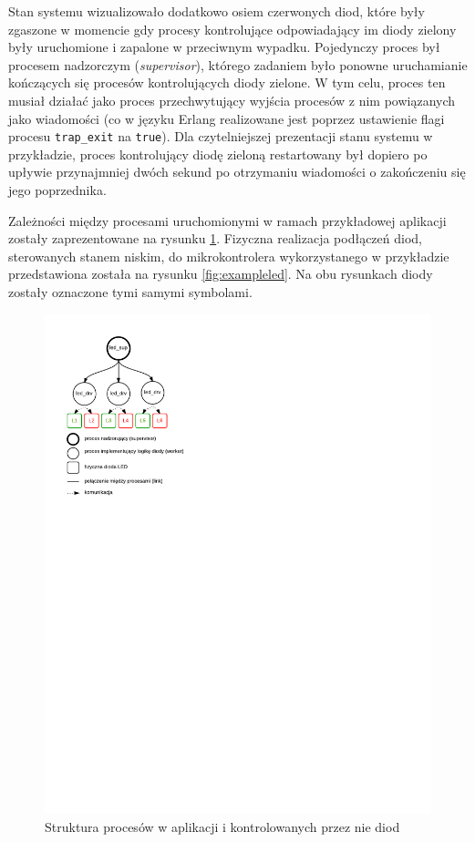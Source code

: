 Stan systemu wizualizowało dodatkowo osiem czerwonych diod, które były zgaszone w momencie gdy procesy kontrolujące odpowiadający im diody zielony były uruchomione i zapalone w przeciwnym wypadku.
Pojedynczy proces był procesem nadzorczym (\emph{supervisor}), którego zadaniem było ponowne uruchamianie kończących się procesów kontrolujących diody zielone. W tym celu, proces ten musiał działać jako proces przechwytujący wyjścia procesów z nim powiązanych jako wiadomości (co w języku Erlang realizowane jest poprzez ustawienie flagi procesu \texttt{trap\_exit} na \texttt{true}).
Dla czytelniejszej prezentacji stanu systemu w przykładzie, proces kontrolujący diodę zieloną restartowany był dopiero po upływie przynajmniej dwóch sekund po otrzymaniu wiadomości o zakończeniu się jego poprzednika.

Zależności między procesami uruchomionymi w ramach przykładowej aplikacji zostały zaprezentowane na rysunku \ref{fig:exampleledprocesses}. Fizyczna realizacja podłączeń diod, sterowanych stanem niskim, do mikrokontrolera wykorzystanego w przykładzie przedstawiona została na rysunku \ref{fig:exampleled}. Na obu rysunkach diody zostały oznaczone tymi samymi symbolami.

\begin{figure}[h]
\centerline{\includegraphics[scale=1, clip, trim=10mm 175mm 135mm 10mm]{example_led_processes}}
\caption{Struktura procesów w aplikacji i kontrolowanych przez nie diod}
\label{fig:exampleledprocesses}
\end{figure}

